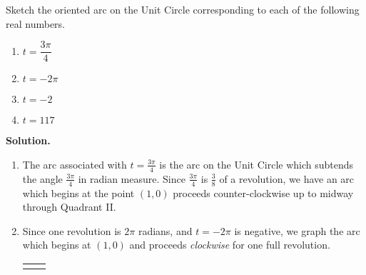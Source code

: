 \documentclass[12pt]{ximera}
\begin{document}
\begin{example} \label{realwrap}  Sketch the oriented arc on the Unit Circle corresponding to each of the following real numbers.  

\begin{multicols}{4}

\begin{enumerate}

\item $t=\dfrac{3 \pi}{4}$

\item $t =  - 2 \pi$

\item $t = -2$

\item  $t = 117$

\end{enumerate}

\end{multicols}

{\bf Solution.}

\begin{enumerate}

\item  The arc associated with $t = \frac{3 \pi}{4}$ is the arc on the Unit Circle which subtends the angle $\frac{3 \pi}{4}$ in radian measure.  Since $\frac{3 \pi}{4}$ is $\frac{3}{8}$ of a revolution, we have an arc which begins at the point $(1,0)$ proceeds counter-clockwise up to midway through Quadrant II.

\item Since one revolution is $2\pi$ radians, and $t=-2\pi$ is negative, we graph  the arc which begins at $(1,0)$ and proceeds \textit{clockwise} for one full revolution.

\hspace{.5in} \begin{tabular}{cc}

 

&

\hspace{1in}


\end{tabular}
\end{enumerate}
\end{example}
\end{document}

